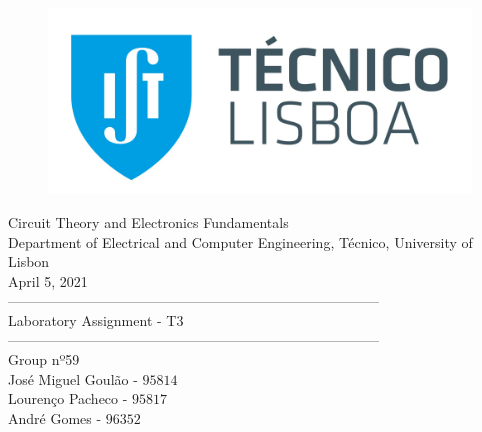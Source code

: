 
\thispagestyle {empty}


\begin{figure}[h]
	\centering
	\includegraphics[width = 0.5\linewidth]{ist_foto}
\end{figure}


\begin{center}

	\vspace{2cm}
	{\FontLb Circuit Theory and Electronics Fundamentals} \\

	\vspace{0.5cm}
	{\FontSn Department of Electrical and Computer Engineering, Técnico, University of Lisbon} \\

	\vspace{0.5cm}
	{\FontSn April 5, 2021} \\

	\vspace{1cm}
	{\FontLb --------------------------------------------------------------------------------} \\
	\vspace{0.1cm}
	{\FontLb Laboratory Assignment - T3} \\
	{\FontLb --------------------------------------------------------------------------------} \\

	\vspace{1cm}
	{\FontMb Group nº59} \\
	\vspace{0.25cm}
	{\FontSn José Miguel Goulão - $95814$} \\
	{\FontSn Lourenço Pacheco - $95817$} \\
	{\FontSn André Gomes - $96352$} \\

	\vspace{1cm}

\end{center}

